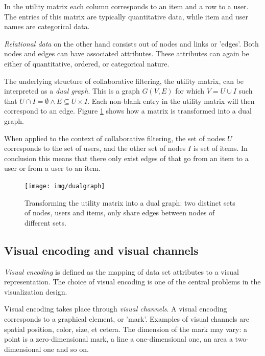 In the utility matrix each column corresponds to an item and a row to a user. The entries of this matrix are typically quantitative data, while item and user names are categorical data.

\emph{Relational data} on the other hand consists out of nodes and links or 'edges'\cite{keim:2002, shirley:2009}. Both nodes and edges can have associated attributes. These attributes can again be either of quantitative, ordered, or categorical nature.

The underlying structure of collaborative filtering, the utility matrix, can be interpreted as a \emph{dual graph}. This is a graph $G(V,E)$ for which $V = U \cup I$ such that $U \cap I = \emptyset \wedge E \subseteq U \times I$\cite{dekimpe:2007}. Each non-blank entry in the utility matrix will then correspond to an edge. Figure \ref{figure:dualgraph} shows how a matrix is transformed into a dual graph.

When applied to the context of collaborative filtering, the set of nodes $U$ corresponds to the set of users, and the other set of nodes $I$ is set of items. In conclusion this means that there only exist edges of that go from an item to a user or from a user to an item.

\begin{figure}%
	\begin{center}
		\texttt{[image: img/dualgraph]}
	\end{center}
	\caption{Transforming the utility matrix into a dual graph: two distinct sets of nodes, users and items, only share edges between nodes of different sets.}%
	\label{figure:dualgraph}%
\end{figure}




\subsection{Visual encoding and visual channels}\label{chapter:literature_study:section:interaction:subsection:encoding}


\emph{Visual encoding} is defined as the mapping of data set attributes to a visual representation. The choice of visual encoding is one of the central problems in the visualization design\cite{shirley:2009}.

Visual encoding takes place through \emph{visual channels}. A visual encoding corresponds to a graphical element, or 'mark'. Examples of visual channels are spatial position, color, size, et cetera. The dimension of the mark may vary: a point is a zero-dimensional mark, a line a one-dimensional one, an area a two-dimensional one and so on.

